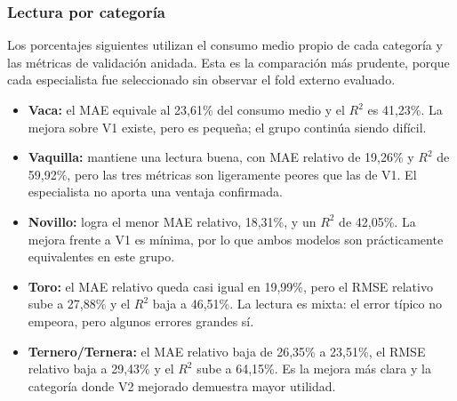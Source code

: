 \documentclass[11pt,a4paper]{article}
\begin{document}
\subsubsection{Lectura por categoría}

Los porcentajes siguientes utilizan el consumo medio propio de cada categoría y las métricas de validación anidada. Esta es la comparación más prudente, porque cada especialista fue seleccionado sin observar el fold externo evaluado.

\begin{table}[H]
\centering
\caption{Lectura relativa de V2 mejorado por categoría.}
\end{table}

\begin{itemize}
  \item \textbf{Vaca:} el MAE equivale al 23,61\% del consumo medio y el $R^2$ es 41,23\%. La mejora sobre V1 existe, pero es pequeña; el grupo continúa siendo difícil.
  \item \textbf{Vaquilla:} mantiene una lectura buena, con MAE relativo de 19,26\% y $R^2$ de 59,92\%, pero las tres métricas son ligeramente peores que las de V1. El especialista no aporta una ventaja confirmada.
  \item \textbf{Novillo:} logra el menor MAE relativo, 18,31\%, y un $R^2$ de 42,05\%. La mejora frente a V1 es mínima, por lo que ambos modelos son prácticamente equivalentes en este grupo.
  \item \textbf{Toro:} el MAE relativo queda casi igual en 19,99\%, pero el RMSE relativo sube a 27,88\% y el $R^2$ baja a 46,51\%. La lectura es mixta: el error típico no empeora, pero algunos errores grandes sí.
  \item \textbf{Ternero/Ternera:} el MAE relativo baja de 26,35\% a 23,51\%, el RMSE relativo baja a 29,43\% y el $R^2$ sube a 64,15\%. Es la mejora más clara y la categoría donde V2 mejorado demuestra mayor utilidad.
\end{itemize}
\end{document}
